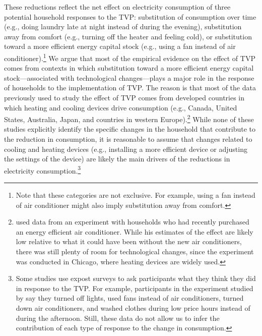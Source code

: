 \documentclass[12pt]{article}
\begin{document}
These reductions reflect the net effect on electricity consumption of three potential household responses to the TVP: substitution of consumption over time (e.g., doing laundry late at night instead of during the evening), substitution away from comfort (e.g., turning off the heater and feeling cold), or substitution toward a more efficient energy capital stock (e.g., using a fan instead of air conditioner).\footnote{Note that these categories are not exclusive. For example, using a fan instead of air conditioner might also imply substitution away from comfort.} We argue that most of the empirical evidence on the effect of TVP comes from contexts in which substitution toward a more efficient energy capital stock---associated with technological changes---plays a major role in the response of households to the implementation of TVP. The reason is that most of the data previously used to study the effect of TVP comes from developed countries in which heating and cooling devices drive consumption (e.g., Canada, United States, Australia, Japan, and countries in western Europe).\footnote{\citet{allcottRethinkingRealtimeElectricity2011} used data from an experiment with households who had recently purchased an energy efficient air conditioner. While his estimates of the effect are likely low relative to what it could have been without the new air conditioners, there was still plenty of room for technological changes, since the experiment was conducted in Chicago, where heating devices are widely used.}  While none of these studies explicitly identify the specific changes in the household that contribute to the reduction in consumption, it is reasonable to assume that changes related to cooling and heating devices (e.g., installing a more efficient device or adjusting the settings of the device) are likely the main drivers of the reductions in electricity consumption.\footnote{Some studies use expost surveys to ask participants what they think they did in response to the TVP. For example, participants in the experiment studied by \citet{allcottRethinkingRealtimeElectricity2011} say they turned off lights, used fans instead of air conditioners, turned down air conditioners, and washed clothes during low price hours instead of during the afternoon. Still, these data do not allow us to infer the contribution of each type of response to the change in consumption.}
\end{document}
